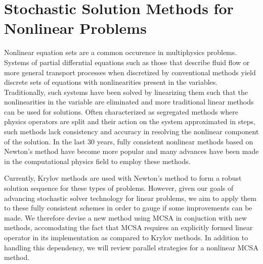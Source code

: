 \chapter{Stochastic Solution Methods for Nonlinear Problems}
\label{ch:nonlinear_problem}
Nonlinear equation sets are a common occurence in multiphysics
problems. Systems of partial differntial equations such as those that
describe fluid flow or more general transport processes when
discretized by conventional methods yield discrete sets of equations
with nonlinearities present in the variables. Traditionally, such
systems have been solved by linearizing them such that the
nonlinearities in the variable are eliminated and more traditional
linear methods can be used for solutions. Often characterized as
segregated methods where physics operators are split and their action
on the system approximated in steps, such methods lack consistency and
accuracy in resolving the nonlinear component of the solution. In the
last 30 years, fully consistent nonlinear methods based on Newton's
method have become more popular and many advances have been made in
the computational physics field to employ these methods. 

Currently, Krylov methods are used with Newton's method to form a
robust solution sequence for these types of problems. However, given
our goals of advancing stochastic solver technology for linear
problems, we aim to apply them to these fully consistent schemes in
order to gauge if some improvements can be made. We therefore devise a
new method using MCSA in conjuction with new methods, accomodating the
fact that MCSA requires an explicitly formed linear operator in its
implementation as compared to Krylov methods. In addition to handling
this dependency, we will review parallel strategies for a nonlinear
MCSA method.

